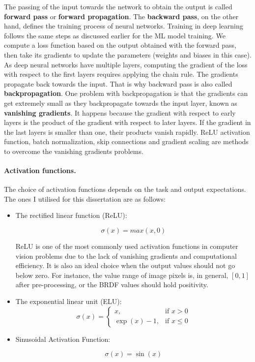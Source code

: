 The passing of the input towards the network to obtain the output is called \textbf{forward pass} or \textbf{forward propagation}. The \textbf{backward pass}, on the other hand, defines the training process of neural networks. Training in deep learning follows the same steps as discussed earlier for the ML model training. We compute a loss function based on the output obtained with the forward pass, then take its gradients to update the parameters (weights and biases in this case). As deep neural networks have multiple layers, computing the gradient of the loss with respect to the first layers requires applying the chain rule. The gradients propagate back towards the input. That is why backward pass is also called \textbf{backpropagation}. One problem with backpropagation is that the gradients can get extremely small as they backpropagate towards the input layer, known as \textbf{vanishing gradients}. It happens because the gradient with respect to early layers is the product of the gradient with respect to later layers. If the gradient in the last layers is smaller than one, their products vanish rapidly. ReLU activation function, batch normalization, skip connections and gradient scaling are methods to overcome the vanishing gradients problems.

\paragraph{Activation functions.} The choice of activation functions depends on the task and output expectations. The ones I utilised for this dissertation are as follows:

\begin{itemize}
\item The rectified linear function (ReLU):

\begin{equation}
\sigma(x) = max(x, 0)
\end{equation}

ReLU is one of the most commonly used activation functions in computer vision problems due to the lack of vanishing gradients and computational efficiency. It is also an ideal choice when the output values should not go below zero. For instance, the value range of image pixels is, in general, $[0, 1]$ after pre-processing, or the BRDF values should hold positivity.

\item The exponential linear unit (ELU):
\begin{equation}
 \sigma(x) = \begin{cases}
x, & \text{if $x>0$}\\
\exp(x) - 1,  & \text{if $x\leq0$} 
  \end{cases}
\end{equation}

\item Sinusoidal Activation Function:

\begin{equation}
\sigma(x) = \sin(x)
\label{eq:sine-act}
\end{equation}
\end{itemize}

